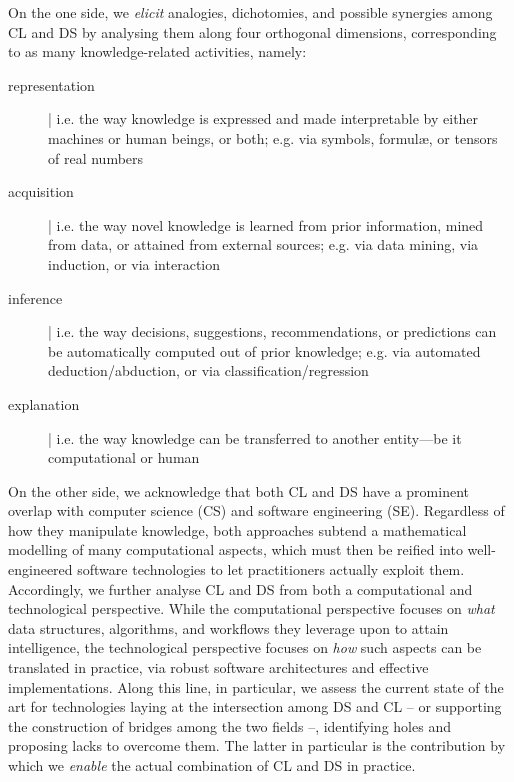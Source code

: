 \documentclass[12pt,a4paper,openright,twoside]{book}
\begin{document}
On the one side, we \emph{elicit} analogies, dichotomies, and possible synergies among CL and DS by analysing them along four orthogonal dimensions, corresponding to as many knowledge-related activities, namely:
%
\begin{description}
    \item[representation] | i.e. the way knowledge is expressed and made interpretable by either machines or human beings, or both; e.g. via symbols, formul\ae, or tensors of real numbers 

    \item[acquisition] | i.e. the way novel knowledge is learned from prior information, mined from data, or attained from external sources; e.g. via data mining, via induction, or via interaction 
    
    \item[inference] |  i.e. the way decisions, suggestions, recommendations, or predictions can be automatically computed out of prior knowledge; e.g. via automated deduction/abduction, or via classification/regression
    
    \item[explanation] | i.e. the way knowledge can be transferred to another entity---be it computational or human
\end{description}

On the other side, we acknowledge that both CL and DS have a prominent overlap with computer science (CS) and software engineering (SE).
%
Regardless of how they manipulate knowledge, both approaches subtend a mathematical modelling of many computational aspects, which must then be reified into well-engineered software technologies to let practitioners actually exploit them. 
%
Accordingly, we further analyse CL and DS from both a computational and technological perspective.
%
While the computational perspective focuses on \emph{what} data structures, algorithms, and workflows they leverage upon to attain intelligence, the technological perspective focuses on \emph{how} such aspects can be translated in practice, via robust software architectures and effective implementations.
%
Along this line, in particular, we assess the current state of the art for technologies laying at the intersection among DS and CL -- or supporting the construction of bridges among the two fields --, identifying holes and proposing lacks to overcome them.
%
The latter in particular is the contribution by which we \emph{enable} the actual combination of CL and DS in practice.
\end{document}
